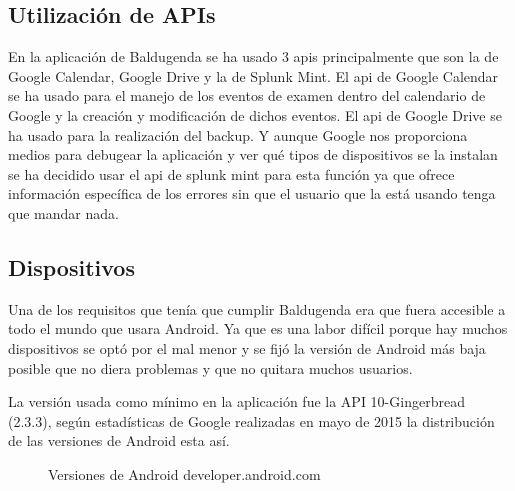 \subsection{Utilización de APIs}
\label{subsecc:Utilización de APIs}

En la aplicación de Baldugenda se ha usado 3 apis principalmente que son la de Google Calendar, Google Drive y la de Splunk Mint.
El api de Google Calendar se ha usado para el manejo de los eventos de examen dentro del calendario de Google y la creación y modificación de dichos eventos.
El api de Google Drive se ha usado para la realización del backup.
Y aunque Google nos proporciona medios para debugear la aplicación y ver qué tipos de dispositivos se la instalan se ha decidido usar el api de splunk mint para esta función ya que ofrece información específica de los errores sin que el usuario que la está usando tenga que mandar nada.

\subsection{Dispositivos}
\label{subsecc:Dispositivos}

Una de los requisitos que tenía que cumplir Baldugenda era que fuera accesible a todo el mundo que usara Android. Ya que es una labor difícil porque hay muchos dispositivos se optó por el mal menor y se fijó la versión de Android más baja posible que no diera problemas y que no quitara muchos usuarios.

La versión usada como mínimo en la aplicación fue la API 10-Gingerbread (2.3.3), según estadísticas de Google realizadas en mayo de 2015 la distribución de las versiones de Android esta así.

\begin{figure}[H] 
  \begin{center} 
    \caption{Versiones de Android developer.android.com} 
    \label{fig:VersionesAndroid} 
  \end{center} 
\end{figure}

